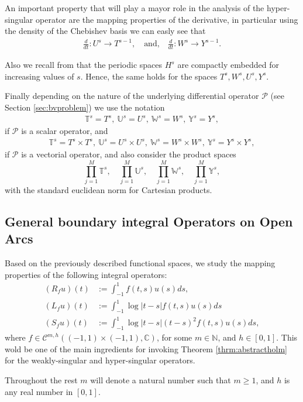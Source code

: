 \documentclass{article}
\newcommand{\IC}{{\mathbb C}}
\newcommand{\IN}{{\mathbb N}}
\newcommand{\IU}{{\mathbb U}}
\newcommand{\IT}{{\mathbb T}}
\newcommand{\IW}{{\mathbb W}}
\newcommand{\IY}{{\mathbb Y}}
\newcommand{\cmspaceh}[4]{\mathcal{C}^{#1,#2} \left( #3, #4 \right)}
\newcommand{\cP}{\mathcal{P}}
\begin{document}
An important property that will play a mayor role in the analysis of the hyper-singular operator are the mapping properties of the derivative, in particular using the density of the Chebishev basis we can easly see that 
\begin{align}
\label{eq:devprop}
\frac{d}{dt} : U^s \rightarrow T^{s-1}, \quad \text{and,} \quad 
\frac{d}{dt} : W^s \rightarrow Y^{s-1}.
\end{align}

Also we recall from \cite[Lemma 5.3.2]{saranen2013periodic} that the periodic spaces $H^s$ are compactly embedded for increasing values of $s$. Hence, the same holds for the spaces $T^s,W^s,U^s,Y^s$.

Finally depending on the nature of the underlying differential operator $\cP$ (see Section \ref{sec:bvproblem}) we use the notation 
\begin{align*}
\IT^s = T^s,\ \IU^s = U^s, \ \IW^s = W^s, \ \IY^s = Y^s,
\end{align*}
if $\cP$ is a scalar operator, and 
\begin{align*}
\IT^s = T^s \times T^s,\ \IU^s = U^s \times U^s, \ \IW^s = W^s \times W^s, \ \IY^s = Y^s \times Y^s,
\end{align*}
if $\cP$ is a vectorial operator, and also consider the product spaces 
$$
\prod_{j=1}^M \IT^s, \quad \prod_{j=1}^M \IU^s,  \quad \prod_{j=1}^M \IW^s, \quad \prod_{j=1}^M \IY^s,
$$
with the standard euclidean norm for Cartesian products.
\subsection{General boundary integral Operators on Open Arcs}
\label{sec:generalbio}

Based on the previously described functional spaces, we study the mapping properties of the following integral operators:
\begin{align*}
(R_f u)(t) &:= \int_{-1}^1f(t,s) u(s) ds,\\
(L_fu)(t) &:= \int_{-1}^1 \log|t-s| f(t,s) u(s) ds\\
(S_f u)(t) &:= \int_{-1}^1 \log|t-s| (t-s)^2 f(t,s)u(s)ds,
\end{align*}
where $f \in \cmspaceh{m}{h}{(-1,1)\times(-1,1)}{\IC}$, for some $m \in \IN$, and $h \in [0,1]$. This wold be one of the main ingredients for invoking Theorem \ref{thrm:abstractholm} for the weakly-singular and hyper-singular operators.

Throughout the rest $m$ will denote a natural number such that $m \geq 1$, and $h$ is any real number in $[0,1]$.
\end{document}
